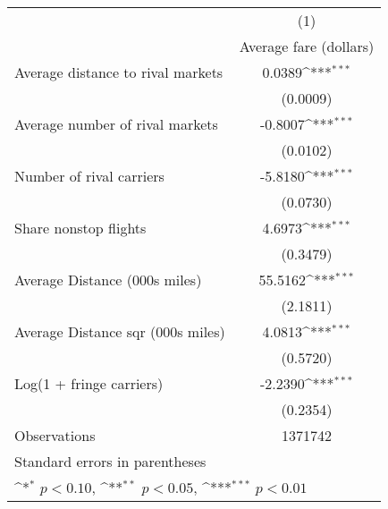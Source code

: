 {
\def\sym#1{\ifmmode^{#1}\else\(^{#1}\)\fi}
\begin{tabular}{l*{1}{c}}
\toprule
                    &\multicolumn{1}{c}{(1)}\\
                    &\multicolumn{1}{c}{Average fare (dollars)}\\
\midrule
Average distance to rival markets&      0.0389\sym{***}\\
                    &    (0.0009)         \\
\addlinespace
Average number of rival markets&     -0.8007\sym{***}\\
                    &    (0.0102)         \\
\addlinespace
Number of rival carriers&     -5.8180\sym{***}\\
                    &    (0.0730)         \\
\addlinespace
Share nonstop flights &      4.6973\sym{***}\\
                    &    (0.3479)         \\
\addlinespace
Average Distance (000s miles)&     55.5162\sym{***}\\
                    &    (2.1811)         \\
\addlinespace
Average Distance sqr (000s miles)&      4.0813\sym{***}\\
                    &    (0.5720)         \\
\addlinespace
Log(1 + fringe carriers)&     -2.2390\sym{***}\\
                    &    (0.2354)         \\
\midrule
Observations        &     1371742         \\
\bottomrule
\multicolumn{2}{l}{\footnotesize Standard errors in parentheses}\\
\multicolumn{2}{l}{\footnotesize \sym{*} \(p<0.10\), \sym{**} \(p<0.05\), \sym{***} \(p<0.01\)}\\
\end{tabular}
}
